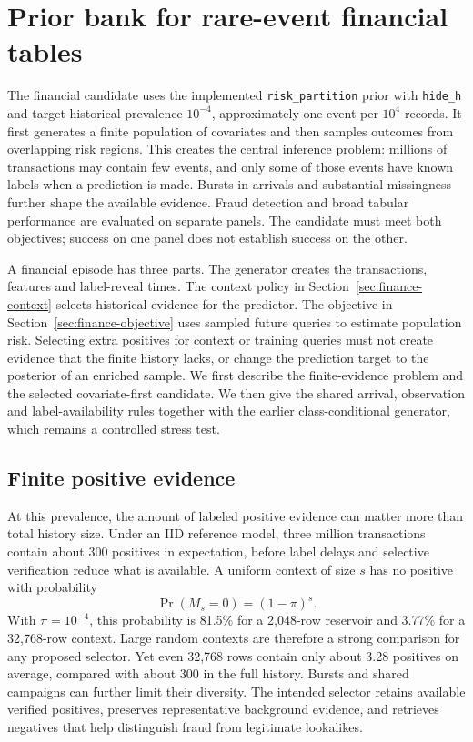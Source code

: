 \documentclass[11pt]{article}
\begin{document}
\section{Prior bank for rare-event financial tables}
\label{sec:finance}

The financial candidate uses the implemented \texttt{risk\_partition} prior with \texttt{hide\_h} and target historical prevalence $10^{-4}$, approximately one event per $10^4$ records. It first generates a finite population of covariates and then samples outcomes from overlapping risk regions. This creates the central inference problem: millions of transactions may contain few events, and only some of those events have known labels when a prediction is made. Bursts in arrivals and substantial missingness further shape the available evidence. Fraud detection and broad tabular performance are evaluated on separate panels. The candidate must meet both objectives; success on one panel does not establish success on the other.

A financial episode has three parts. The generator creates the transactions, features and label-reveal times. The context policy in Section~\ref{sec:finance-context} selects historical evidence for the predictor. The objective in Section~\ref{sec:finance-objective} uses sampled future queries to estimate population risk. Selecting extra positives for context or training queries must not create evidence that the finite history lacks, or change the prediction target to the posterior of an enriched sample. We first describe the finite-evidence problem and the selected covariate-first candidate. We then give the shared arrival, observation and label-availability rules together with the earlier class-conditional generator, which remains a controlled stress test.

\subsection{Finite positive evidence}

At this prevalence, the amount of labeled positive evidence can matter more than total history size. Under an IID reference model, three million transactions contain about 300 positives in expectation, before label delays and selective verification reduce what is available. A uniform context of size $s$ has no positive with probability
\begin{equation}
\Pr(M_s=0)=(1-\pi)^s.
\end{equation}
With $\pi=10^{-4}$, this probability is 81.5\% for a 2,048-row reservoir and 3.77\% for a 32,768-row context. Large random contexts are therefore a strong comparison for any proposed selector. Yet even 32,768 rows contain only about 3.28 positives on average, compared with about 300 in the full history. Bursts and shared campaigns can further limit their diversity. The intended selector retains available verified positives, preserves representative background evidence, and retrieves negatives that help distinguish fraud from legitimate lookalikes.
\end{document}
